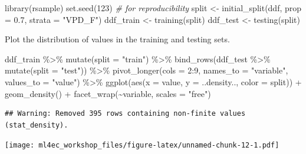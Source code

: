 \documentclass[
]{book}
\newenvironment{Shaded}{\begin{snugshade}}{\end{snugshade}}
\newcommand{\AttributeTok}[1]{\textcolor[rgb]{0.77,0.63,0.00}{#1}}
\newcommand{\CommentTok}[1]{\textcolor[rgb]{0.56,0.35,0.01}{\textit{#1}}}
\newcommand{\DecValTok}[1]{\textcolor[rgb]{0.00,0.00,0.81}{#1}}
\newcommand{\FloatTok}[1]{\textcolor[rgb]{0.00,0.00,0.81}{#1}}
\newcommand{\FunctionTok}[1]{\textcolor[rgb]{0.00,0.00,0.00}{#1}}
\newcommand{\NormalTok}[1]{#1}
\newcommand{\OtherTok}[1]{\textcolor[rgb]{0.56,0.35,0.01}{#1}}
\newcommand{\SpecialCharTok}[1]{\textcolor[rgb]{0.00,0.00,0.00}{#1}}
\newcommand{\StringTok}[1]{\textcolor[rgb]{0.31,0.60,0.02}{#1}}
\begin{document}
\begin{Shaded}
\begin{Highlighting}[]
\FunctionTok{library}\NormalTok{(rsample)}
\FunctionTok{set.seed}\NormalTok{(}\DecValTok{123}\NormalTok{)  }\CommentTok{\# for reproducibility}
\NormalTok{split }\OtherTok{\textless{}{-}} \FunctionTok{initial\_split}\NormalTok{(ddf, }\AttributeTok{prop =} \FloatTok{0.7}\NormalTok{, }\AttributeTok{strata =} \StringTok{"VPD\_F"}\NormalTok{)}
\NormalTok{ddf\_train }\OtherTok{\textless{}{-}} \FunctionTok{training}\NormalTok{(split)}
\NormalTok{ddf\_test }\OtherTok{\textless{}{-}} \FunctionTok{testing}\NormalTok{(split)}
\end{Highlighting}
\end{Shaded}

Plot the distribution of values in the training and testing sets.

\begin{Shaded}
\begin{Highlighting}[]
\NormalTok{ddf\_train }\SpecialCharTok{\%\textgreater{}\%} 
  \FunctionTok{mutate}\NormalTok{(}\AttributeTok{split =} \StringTok{"train"}\NormalTok{) }\SpecialCharTok{\%\textgreater{}\%} 
  \FunctionTok{bind\_rows}\NormalTok{(ddf\_test }\SpecialCharTok{\%\textgreater{}\%} 
    \FunctionTok{mutate}\NormalTok{(}\AttributeTok{split =} \StringTok{"test"}\NormalTok{)) }\SpecialCharTok{\%\textgreater{}\%} 
  \FunctionTok{pivot\_longer}\NormalTok{(}\AttributeTok{cols =} \DecValTok{2}\SpecialCharTok{:}\DecValTok{9}\NormalTok{, }\AttributeTok{names\_to =} \StringTok{"variable"}\NormalTok{, }\AttributeTok{values\_to =} \StringTok{"value"}\NormalTok{) }\SpecialCharTok{\%\textgreater{}\%} 
  \FunctionTok{ggplot}\NormalTok{(}\FunctionTok{aes}\NormalTok{(}\AttributeTok{x =}\NormalTok{ value, }\AttributeTok{y =}\NormalTok{ ..density.., }\AttributeTok{color =}\NormalTok{ split)) }\SpecialCharTok{+}
  \FunctionTok{geom\_density}\NormalTok{() }\SpecialCharTok{+}
  \FunctionTok{facet\_wrap}\NormalTok{(}\SpecialCharTok{\textasciitilde{}}\NormalTok{variable, }\AttributeTok{scales =} \StringTok{"free"}\NormalTok{)}
\end{Highlighting}
\end{Shaded}

\begin{verbatim}
## Warning: Removed 395 rows containing non-finite values (stat_density).
\end{verbatim}

\texttt{[image: ml4ec\_workshop\_files/figure-latex/unnamed-chunk-12-1.pdf]}
\end{document}
